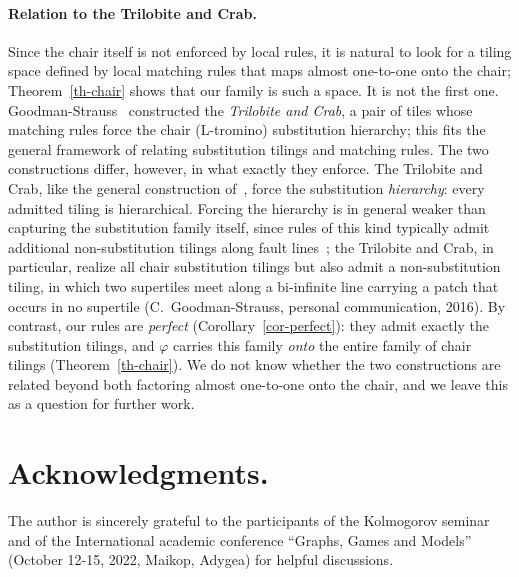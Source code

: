 \documentclass[11pt]{article}
\theoremstyle{remark}
\begin{document}
\paragraph{Relation to the Trilobite and Crab.}
Since the chair itself is not enforced by local rules, it is natural to look for
a tiling space defined by local matching rules that maps almost one-to-one onto
the chair; Theorem~\ref{th-chair} shows that our family is such a space. It is
not the first one. Goodman-Strauss~\cite{gscrab} constructed the
\emph{Trilobite and Crab}, a pair of tiles whose matching rules force the chair
(L-tromino) substitution hierarchy; this fits the general framework of
\cite{gs} relating substitution tilings and matching rules. The two
constructions differ, however, in what exactly they enforce. The Trilobite and
Crab, like the general construction of~\cite{gs}, force the substitution
\emph{hierarchy}: every admitted tiling is hierarchical. Forcing the hierarchy
is in general weaker than capturing the substitution family itself, since rules
of this kind typically admit additional non-substitution tilings along fault
lines~\cite{frank,gsrev}; the Trilobite and Crab, in particular, realize all
chair substitution tilings but also admit a non-substitution tiling, in which
two supertiles meet along a bi-infinite line carrying a patch that occurs in no
supertile (C.~Goodman-Strauss, personal communication, 2016). By contrast, our
rules are \emph{perfect}
(Corollary~\ref{cor-perfect}): they admit exactly the substitution tilings, and
$\varphi$ carries this family \emph{onto} the entire family of chair tilings
(Theorem~\ref{th-chair}). We do not know whether the two constructions are
related beyond both factoring almost one-to-one onto the chair, and we leave
this as a question for further work.

\section{Acknowledgments. }
The author is sincerely grateful to the participants of the Kolmogorov seminar and of the 
International academic conference “Graphs, Games and Models'' (October 12-15, 2022, Maikop, Adygea)
for helpful discussions.
\end{document}
